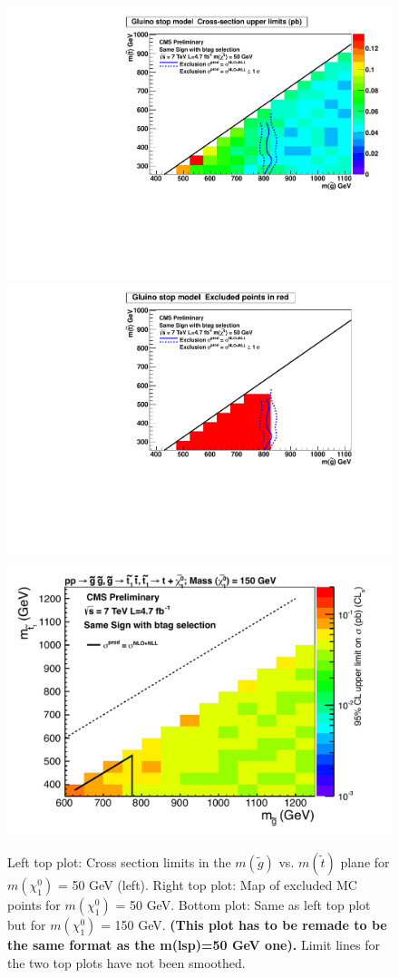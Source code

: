 \begin{figure}[htb]
\begin{center}
\includegraphics[width=0.49\linewidth]{figs/GlStop_50_LimitsOnCarpet.pdf}
\includegraphics[width=0.49\linewidth]{figs/GlStop_50_ExcludedRegionMap.pdf}
\includegraphics[width=0.49\linewidth]{figs/gluinostop150.pdf}
\caption{Left top plot: Cross section limits in the $m(\widetilde{g})$ 
vs. $m(\widetilde{t})$ plane
for $m(\chi_1^0)$ = 50 GeV (left).
Right top plot: Map of excluded MC points for 
$m(\chi_1^0)$ = 50 GeV.
Bottom plot: Same as left top plot but for $m(\chi_1^0)$ = 150 GeV.
{\bf (This plot has to be remade to be the same format as the m(lsp)=50
GeV one).} Limit lines for the two top plots have not been smoothed. 
\label{fig:mglinoStop}}
\end{center}
\end{figure}




